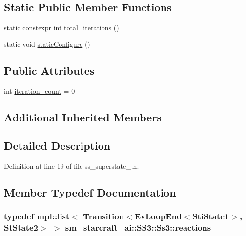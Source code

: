 \subsection*{Static Public Member Functions}
\begin{DoxyCompactItemize}
\item 
static constexpr int \hyperlink{structsm__starcraft__ai_1_1SS3_1_1Ss3_ae4d6e55ad9192de98d18d9b6b07544f8}{total\+\_\+iterations} ()
\item 
static void \hyperlink{structsm__starcraft__ai_1_1SS3_1_1Ss3_a6b5230a8017a197639d0633e0272e682}{static\+Configure} ()
\end{DoxyCompactItemize}
\subsection*{Public Attributes}
\begin{DoxyCompactItemize}
\item 
int \hyperlink{structsm__starcraft__ai_1_1SS3_1_1Ss3_a836cce7ce2156a597c85d9cd2df24575}{iteration\+\_\+count} = 0
\end{DoxyCompactItemize}
\subsection*{Additional Inherited Members}


\subsection{Detailed Description}


Definition at line 19 of file ss\+\_\+superstate\+\_.\+h.



\subsection{Member Typedef Documentation}
\subsubsection[{\texorpdfstring{reactions}{reactions}}]{\setlength{\rightskip}{0pt plus 5cm}typedef mpl\+::list$<$ Transition$<$Ev\+Loop\+End$<${\bf Sti\+State1}$>$, {\bf St\+State2}$>$ $>$ {\bf sm\+\_\+starcraft\+\_\+ai\+::\+S\+S3\+::\+Ss3\+::reactions}}\hypertarget{structsm__starcraft__ai_1_1SS3_1_1Ss3_af5e2b5178c1100c90385485918ef0882}{}\label{structsm__starcraft__ai_1_1SS3_1_1Ss3_af5e2b5178c1100c90385485918ef0882}


